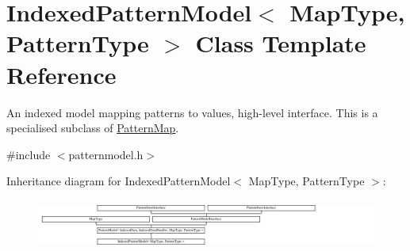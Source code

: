 \hypertarget{classIndexedPatternModel}{}\section{Indexed\+Pattern\+Model$<$ Map\+Type, Pattern\+Type $>$ Class Template Reference}
\label{classIndexedPatternModel}


An indexed model mapping patterns to values, high-\/level interface. This is a specialised subclass of \hyperlink{classPatternMap}{Pattern\+Map}.  




{\ttfamily \#include $<$patternmodel.\+h$>$}

Inheritance diagram for Indexed\+Pattern\+Model$<$ Map\+Type, Pattern\+Type $>$\+:\begin{figure}[H]
\begin{center}
\leavevmode
\includegraphics[height=1.651917cm]{classIndexedPatternModel}
\end{center}
\end{figure}
